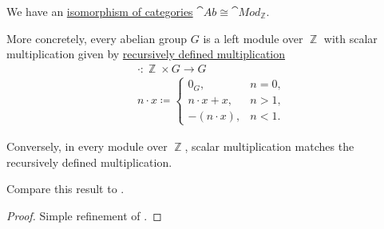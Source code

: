 \begin{proposition}\label{thm:abelian_group_is_module}
  We have an \hyperref[rem:category_similarity/isomorphism]{isomorphism of categories} \( \hyperref[def:abelian_group]{\cat{Ab}} \cong \hyperref[def:module]{\cat{Mod}_\BbbZ} \).

  More concretely, every abelian group \( G \) is a left module over \( \BbbZ \) with scalar multiplication given by \hyperref[rem:additive_magma/multiplication]{recursively defined multiplication}
  \begin{equation}\label{eq:thm:abelian_group_is_module/operation}
    \begin{aligned}
      &\cdot: \BbbZ \times G \to G \\
      &n \cdot x \coloneqq \begin{cases}
        0_G,           &n = 0, \\
        n \cdot x + x, &n > 1, \\
        -(n \cdot x),  &n < 1.
      \end{cases}
    \end{aligned}
  \end{equation}

  Conversely, in every module over \( \BbbZ \), scalar multiplication matches the recursively defined multiplication.

  Compare this result to .
\end{proposition}
\begin{proof}
  Simple refinement of .
\end{proof}

